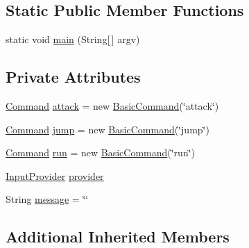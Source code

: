 \subsection*{Static Public Member Functions}
\begin{DoxyCompactItemize}
\item 
static void \mbox{\hyperlink{classorg_1_1newdawn_1_1slick_1_1tests_1_1_input_provider_test_a7771e32ff42ae4161c6f1eaffdb2efb9}{main}} (String\mbox{[}$\,$\mbox{]} argv)
\end{DoxyCompactItemize}
\subsection*{Private Attributes}
\begin{DoxyCompactItemize}
\item 
\mbox{\hyperlink{interfaceorg_1_1newdawn_1_1slick_1_1command_1_1_command}{Command}} \mbox{\hyperlink{classorg_1_1newdawn_1_1slick_1_1tests_1_1_input_provider_test_a8a624395dae059c0cfaab284f7d69eda}{attack}} = new \mbox{\hyperlink{classorg_1_1newdawn_1_1slick_1_1command_1_1_basic_command}{Basic\+Command}}(\char`\"{}attack\char`\"{})
\item 
\mbox{\hyperlink{interfaceorg_1_1newdawn_1_1slick_1_1command_1_1_command}{Command}} \mbox{\hyperlink{classorg_1_1newdawn_1_1slick_1_1tests_1_1_input_provider_test_a173ff3b9a22623008ac6eea7d6ab07a3}{jump}} = new \mbox{\hyperlink{classorg_1_1newdawn_1_1slick_1_1command_1_1_basic_command}{Basic\+Command}}(\char`\"{}jump\char`\"{})
\item 
\mbox{\hyperlink{interfaceorg_1_1newdawn_1_1slick_1_1command_1_1_command}{Command}} \mbox{\hyperlink{classorg_1_1newdawn_1_1slick_1_1tests_1_1_input_provider_test_aaa8a5641456fb2963ab865f7d761eb38}{run}} = new \mbox{\hyperlink{classorg_1_1newdawn_1_1slick_1_1command_1_1_basic_command}{Basic\+Command}}(\char`\"{}run\char`\"{})
\item 
\mbox{\hyperlink{classorg_1_1newdawn_1_1slick_1_1command_1_1_input_provider}{Input\+Provider}} \mbox{\hyperlink{classorg_1_1newdawn_1_1slick_1_1tests_1_1_input_provider_test_a7249d16e0b69f5ee309e1da3c059ceef}{provider}}
\item 
String \mbox{\hyperlink{classorg_1_1newdawn_1_1slick_1_1tests_1_1_input_provider_test_a730fb6709b68daac2561204c3ab0e7fc}{message}} = \char`\"{}\char`\"{}
\end{DoxyCompactItemize}
\subsection*{Additional Inherited Members}


